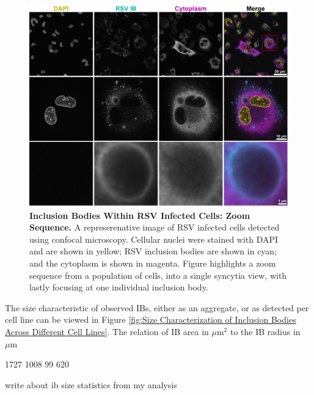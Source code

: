 \begin{figure}
    \centering
    \includegraphics[width=1\linewidth]{08. Chapter 3/Figs/01. Localisation introduction/01. IB-zooms.pdf}
    \caption[Inclusion Bodies Within RSV Infected Cells: Zoom Sequence.]{\textbf{Inclusion Bodies Within RSV Infected Cells: Zoom Sequence.} A represerenative image of RSV infected cells detected using confocal microscopy. Cellular nuclei were stained with DAPI and are shown in yellow; RSV inclusion bodies are shown in cyan; and the cytoplasm is shown in magenta. Figure highlights a zoom sequence from a population of cells, into a single syncytia view, with lastly focusing at one individual inclusion body.}
    \label{fig:Inclusion Bodies Within RSV Infected Cells: Zoom Sequence}
\end{figure}

The size characteristic of observed IBs, either as an aggregate, or as detected per cell line can be viewed in Figure \ref{fig:Size Characterization of Inclusion Bodies Across Different Cell Lines}. The relation of IB area in \(\mu \mbox{m}^2\) to the IB radius in \(\mu \mbox{m}\)

1727 1008 99 620

write about ib size statistics from my analysis

